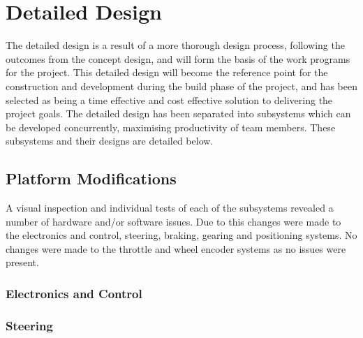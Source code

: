 \documentclass[main.tex]{subfiles}
\begin{document}
\chapter{Detailed Design}

The detailed design is a result of a more thorough design process, following the outcomes from the concept design, and will form the basis of the work programs for the project. This detailed design will become the reference point for the construction and development during the build phase of the project, and has been selected as being a time effective and cost effective solution to delivering the project goals. The detailed design has been separated into subsystems which can be developed concurrently, maximising productivity of team members. These subsystems and their designs are detailed below.
\section{Platform Modifications}
A visual inspection and individual tests of each of the subsystems revealed a number of hardware and/or software issues. Due to this changes were made to the electronics and control, steering, braking, gearing and positioning systems. No changes were made to the throttle and wheel encoder systems as no issues were present.
\subsection{Electronics and Control}

\subsection{Steering}
\end{document}
